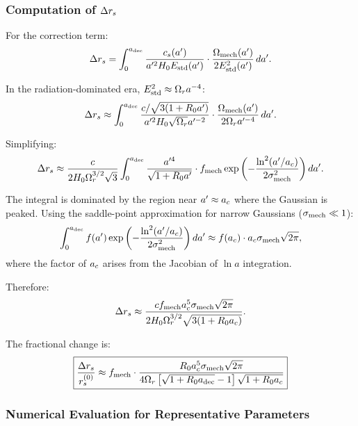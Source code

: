 \subsubsection{Computation of $\Delta r_s$}

For the correction term:
\begin{equation}
\Delta r_s = \int_0^{a_{\mathrm{dec}}} \frac{c_s(a')}{a'^2 H_0 E_{\mathrm{std}}(a')} \cdot \frac{\Omega_{\mathrm{mech}}(a')}{2 E_{\mathrm{std}}^2(a')} \, da'.
\end{equation}

In the radiation-dominated era, $E_{\mathrm{std}}^2 \approx \Omega_r a^{-4}$:
\begin{equation}
\Delta r_s \approx \int_0^{a_{\mathrm{dec}}} \frac{c/\sqrt{3(1+R_0 a')}}{a'^2 H_0 \sqrt{\Omega_r} a'^{-2}} \cdot \frac{\Omega_{\mathrm{mech}}(a')}{2 \Omega_r a'^{-4}} \, da'.
\end{equation}

Simplifying:
\begin{equation}
\Delta r_s \approx \frac{c}{2 H_0 \Omega_r^{3/2} \sqrt{3}} \int_0^{a_{\mathrm{dec}}} \frac{a'^4}{\sqrt{1+R_0 a'}} \cdot f_{\mathrm{mech}} \exp\left( -\frac{\ln^2(a'/a_c)}{2\sigma_{\mathrm{mech}}^2} \right) da'.
\end{equation}

The integral is dominated by the region near $a' \approx a_c$ where the Gaussian is peaked. Using the saddle-point approximation for narrow Gaussians ($\sigma_{\mathrm{mech}} \ll 1$):
\begin{equation}
\int_0^{a_{\mathrm{dec}}} f(a') \exp\left( -\frac{\ln^2(a'/a_c)}{2\sigma_{\mathrm{mech}}^2} \right) da' \approx f(a_c) \cdot a_c \sigma_{\mathrm{mech}} \sqrt{2\pi},
\end{equation}
where the factor of $a_c$ arises from the Jacobian of $\ln a$ integration.

Therefore:
\begin{equation}
\Delta r_s \approx \frac{c f_{\mathrm{mech}} a_c^5 \sigma_{\mathrm{mech}} \sqrt{2\pi}}{2 H_0 \Omega_r^{3/2} \sqrt{3(1+R_0a_c)}}.
\end{equation}

The fractional change is:
\begin{equation}
\label{eq:fractional_rs_change}
\boxed{\frac{\Delta r_s}{r_s^{(0)}} \approx f_{\mathrm{mech}} \cdot \frac{R_0 a_c^5 \sigma_{\mathrm{mech}} \sqrt{2\pi}}{4 \Omega_r \left[\sqrt{1+R_0a_{\mathrm{dec}}} - 1\right] \sqrt{1+R_0a_c}}}
\end{equation}

\subsubsection{Numerical Evaluation for Representative Parameters}

